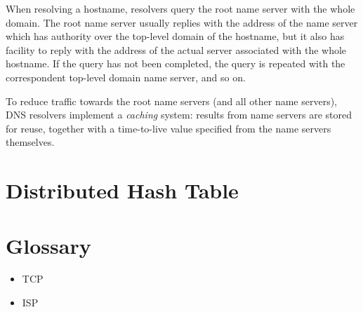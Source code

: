 \documentclass[mscthesis]{usiinfthesis}
\begin{document}
When resolving a hostname, resolvers query the root name server with the whole domain. The root name server usually replies with the address of the name server which has authority over the top-level domain of the hostname, but it also has facility to reply with the address of the actual server associated with the whole hostname. If the query has not been completed, the query is repeated with the correspondent top-level domain name server, and so on.

To reduce traffic towards the root name servers (and all other name servers), DNS resolvers implement a \emph{caching} system: results from name servers are stored for reuse, together with a time-to-live value specified from the name servers themselves. 

\chapter{Distributed Hash Table}\label{appx:dht}

\backmatter

\chapter{Glossary}
\begin{itemize}
	\item TCP
	\item ISP
	
\end{itemize}

%
%


\end{document}
